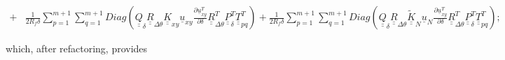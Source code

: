 \documentclass[review]{elsarticle}
\begin{document}
\begin{equation}
\begin{split}
+&\frac{1}{2R_{f}\delta}\sum_{p=1}^{m+1}\sum_{q=1}^{m+1}Diag\left(\underline{\underline{Q}}_{\delta}\underline{\underline{R}}_{\Delta\theta}\underline{\underline{K}}_{xy}\underline{u}_{xy}\frac{\partial \underline{u}_{xy}^{T}}{\partial \delta}\underline{\underline{R}}_{\Delta\theta}^{T}\underline{\underline{P}}_{\delta}^{T}\underline{\underline{T}}_{pq}^{T}\right)+\frac{1}{2R_{f}\delta}\sum_{p=1}^{m+1}\sum_{q=1}^{m+1}Diag\left(\underline{\underline{Q}}_{\delta}\underline{\underline{R}}_{\Delta\theta}\underline{\underline{\widetilde{K}}}_{N}\underline{u}_{N}\frac{\partial \underline{u}_{xy}^{T}}{\partial \delta}\underline{\underline{R}}_{\Delta\theta}^{T}\underline{\underline{P}}_{\delta}^{T}\underline{\underline{T}}_{pq}^{T}\right);
\end{split}
\end{equation}

which, after refactoring, provides
\end{document}
